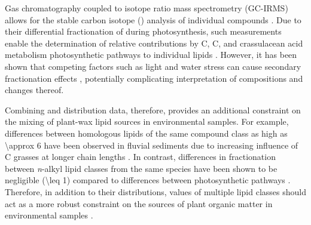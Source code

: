 Gas chromatography coupled to isotope ratio mass spectrometry (GC-IRMS) allows for the stable carbon isotope () analysis of individual compounds \citep{Hayes:1989us,Hayes:1993wa}. Due to their differential fractionation of  during photosynthesis, such measurements enable the determination of relative contributions by C, C, and crassulacean acid metabolism photosynthetic pathways to individual lipids \citep[][and references therein]{Collister:1994hb,Hobbie:2004iq}. However, it has been shown that competing factors such as light and water stress can cause secondary fractionation effects \citep[\textit{\textit{e.g.}}][]{Graham:2014hf}, potentially complicating interpretation of  compositions and changes thereof.

Combining  and distribution data, therefore, provides an additional constraint on the mixing of plant-wax lipid sources in environmental samples. For example,  differences between homologous lipids of the same compound class as high as \SI{\approx 6}{\permil} have been observed in fluvial sediments due to increasing influence of C grasses at longer chain lengths \citep{Freeman:2001tv,Galy:2011ix,Hoetzel:2013hj, Wang:2013jz,Agrawal:2014fl}. In contrast, differences in  fractionation between \textit{n}-alkyl lipid classes from the same species have been shown to be negligible (\SI{\leq 1}{\permil}) compared to differences between photosynthetic pathways \citep[\SI{\approx 13}{\permil}][]{Chikaraishi:2007hj,Rommerskirchen:2006gr,Vogts:2009fb}. Therefore, in addition to their distributions,  values of multiple lipid classes should act as a more robust constraint on the sources of plant organic matter in environmental samples \citep[\textit{e.g.}][]{Chikaraishi:2006gb,Diefendorf:2011hg,Galy:2011ix,Feng:2013iv,Tao:2015bq}.

